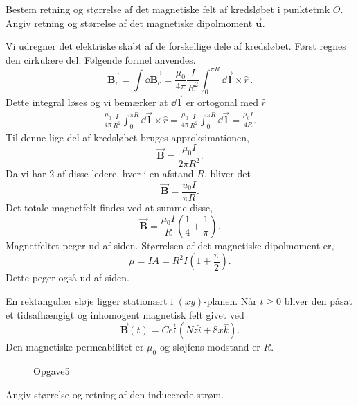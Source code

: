 \begin{subexercise}[a]
Bestem retning og størrelse af det magnetiske felt af kredsløbet i punktetmk $O$.\\
Angiv retning og størrelse af det magnetiske dipolmoment  $\vec{\mathbf{u}} $.
\end{subexercise}
\begin{solution}
Vi udregner det elektriske skabt af de forskellige dele af kredsløbet. Først regnes den cirkulære del. Følgende formel anvendes.
\[
\vec{\mathbf{B_c}} = \int \dd \vec{\mathbf{B_c}} = \frac{\mu_0}{4\pi}\frac{I}{R^2} \int_{0}^{\pi R} \dd \vec{\mathbf{l}} \times \hat{r}\, 
.\]
Dette integral løses og vi bemærker at $\dd \vec{\mathbf{l}} $ er ortogonal med $\hat{r}$
\begin{align*}
	\frac{\mu_0}{4\pi}\frac{I}{R^2} \int_{0}^{\pi R} \dd \vec{\mathbf{l}} \times \hat{r} = \frac{\mu_0}{4\pi}\frac{I}{R^2} \int_{0}^{\pi R} \dd \vec{\mathbf{l}} = \frac{\mu_0I}{4R}
.\end{align*}
Til denne lige del af kredsløbet bruges approksimationen,
\[
\vec{\mathbf{B}}  = \frac{\mu_0I}{2\pi R^2}
.\]
Da vi har 2 af disse ledere, hver i en afstand $R$, bliver det
 \[
\vec{\mathbf{B}} = \frac{u_0I}{\pi R} 
.\]
Det totale magnetfelt findes ved at summe disse,
\[
\vec{\mathbf{B}} = \frac{\mu_0I}{R}\left( \frac{1}{4} + \frac{1}{\pi} \right) 
.\]
Magnetfeltet peger ud af siden. Størrelsen af det magnetiske dipolmoment er,
\[
\mu = IA = R^2I\left( 1 + \frac{\pi}{2} \right)
.\] 
Dette peger også ud af siden.
\end{solution}
\newpage
\begin{exercise}[Opgave 5.]
En rektangulær sløje ligger stationært i $\left( xy \right) $-planen. Når $t\ge 0$ bliver den påsat et tidsafhængigt og inhomogent magnetisk felt givet ved
\[
\vec{\mathbf{B}} \left( t \right) = Ce^{\frac{t}{\tau}}\left( Nz \hat{i}+8x \hat{k} \right) 
.\]
Den magnetiske permeabilitet er $\mu_0$ og sløjfens modstand er $R$.
\end{exercise}
\begin{figure}[ht]
    \centering
    \caption{Opgave5}
    \label{fig:opgave5}
\end{figure}
\begin{subexercise}[a]
Angiv størrelse og retning af den inducerede strøm.
\end{subexercise}
